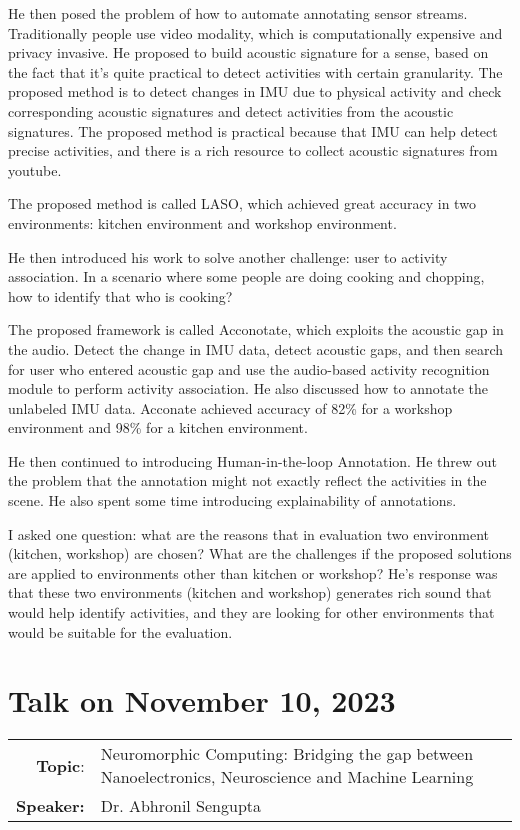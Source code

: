 \documentclass[11pt, oneside]{article}   	%
\begin{document}
He then posed the problem of how to automate annotating sensor streams. Traditionally people use video modality, which is computationally expensive and privacy invasive. He proposed to build acoustic signature for a sense, based on the fact that it's quite practical to detect activities with certain granularity.  The proposed method is to detect changes in IMU due to physical activity and check corresponding acoustic signatures and detect activities from the acoustic signatures. The proposed method is practical because that IMU can help detect precise activities, and there is a rich resource to collect acoustic signatures from youtube.

The proposed method is called LASO, which achieved great accuracy in two environments: kitchen environment and workshop environment. 

He then introduced his work to solve another challenge: user to activity association. In a scenario where some people are doing cooking and chopping, how to identify that who is cooking?

The proposed framework is called Acconotate, which exploits the acoustic gap in the audio. Detect the change in IMU data, detect acoustic gaps, and then search for user who entered acoustic gap and use the audio-based activity recognition module to perform activity association. He also discussed how to annotate the unlabeled IMU data. 
Acconate achieved accuracy of 82\% for a workshop environment and 98\% for a kitchen environment. 

He then continued to introducing Human-in-the-loop Annotation. He threw out the problem that the annotation might not exactly reflect the activities in the scene. He also spent some time introducing explainability of annotations. 

I asked one question: what are the reasons that in evaluation two environment (kitchen, workshop) are chosen? What are the challenges if the proposed solutions are applied to environments other than kitchen or workshop? He's response was that these two environments (kitchen and workshop) generates rich sound that would help identify activities, and they are looking for other environments that would be suitable for the evaluation.

\newpage
\section{Talk on November 10, 2023}
\begin{tabularx} {\textwidth}{r X}
\textbf{Topic}: &Neuromorphic Computing: Bridging the gap between Nanoelectronics, Neuroscience and Machine Learning\\
\textbf{Speaker:} & Dr. Abhronil Sengupta\\
\end{tabularx}
\end{document}
